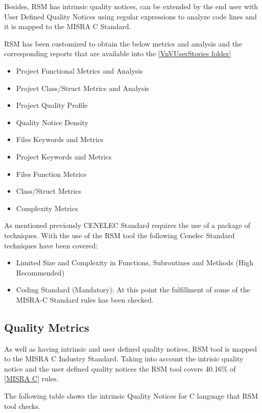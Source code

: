 Besides, RSM has intrinsic quality notices, can be extended by the end user with User Defined Quality Notices using regular expressions to analyze code lines and it is mapped to the MISRA C Standard. 

RSM has been customized to obtain the below metrics and analysis and the corresponding reports that are available into the \href{https://github.com/openETCS/validation/tree/master/VnVUserStories/VnVUserStorySQS/04-Results}{[VnVUserStories folder]}

\begin{itemize}
\item Project Functional Metrics and Analysis
\item Project Class/Struct Metrics and Analysis
\item Project Quality Profile
\item Quality Notice Density
\item Files Keywords and Metrics
\item Project Keywords and Metrics
\item Files Function Metrics
\item Class/Struct Metrics
\item Complexity Metrics
\end{itemize}

As mentioned previously CENELEC Standard requires the use of a package of techniques. With the use of the RSM tool the following Cenelec Standard techniques have been covered:
\begin{itemize}
\item Limited Size and Complexity in Functions, Subroutines and Methods (High Recommended)
\item Coding Standard (Mandatory): At this point the fulfillment of some of the MISRA-C Standard rules has been checked.
\end{itemize}

\subsection{Quality Metrics}

As well as having intrinsic and user defined quality notices, RSM tool is mapped to the MISRA C Industry Standard. Taking into account the intrisic quality notice and the user defined quality notices the RSM tool covers 40.16\% of \href{http://msquaredtechnologies.com/m2rsm/docs/QualityStandards/MISRA_C_Mapping.htm}{[MISRA C]} rules.

The following table shows the intrinsic Quality Notices for C language that RSM tool checks.

